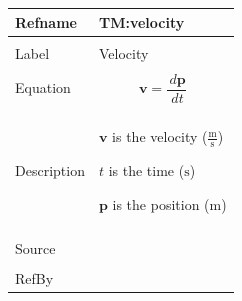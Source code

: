 \documentclass[12pt]{article}
\begin{document}
\begin{minipage}{\textwidth}
\begin{tabular}{>{\raggedright}p{}>{\raggedright\arraybackslash}p{}}
\toprule \textbf{Refname} & \textbf{TM:velocity}
\label{TM:velocity}
\\ \midrule \\
Label & Velocity
        
\\ \midrule \\
Equation & \begin{displaymath}
           \mathbf{v}=\frac{\,d\mathbf{p}}{\,dt}
           \end{displaymath}
\\ \midrule \\
Description & \begin{symbDescription}
              \item{$\mathbf{v}$ is the velocity ($\frac{\text{m}}{\text{s}}$)}
              \item{$t$ is the time (${\text{s}}$)}
              \item{$\mathbf{p}$ is the position (${\text{m}}$)}
              \end{symbDescription}
\\ \midrule \\
Source & \cite{velocityWiki}
         
\\ \midrule \\
RefBy & 
\\ \bottomrule
\end{tabular}
\end{minipage}
\vspace{\baselineskip}
\noindent
\end{document}

